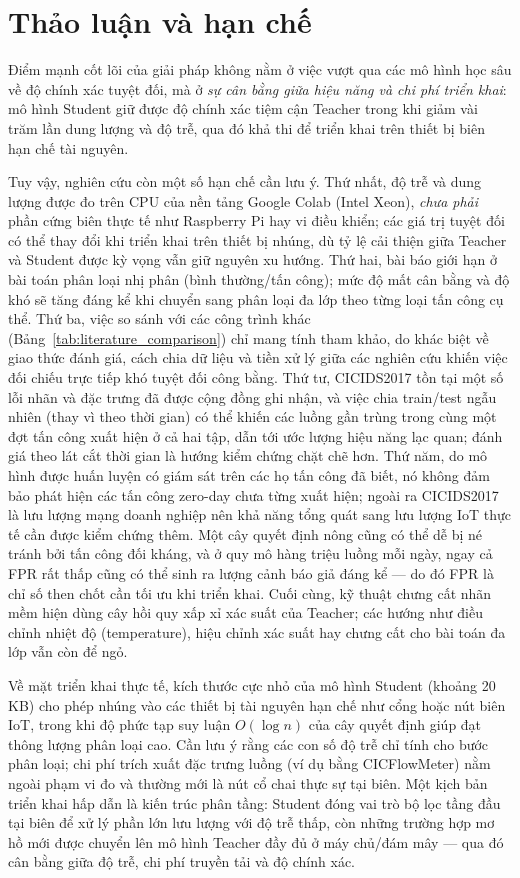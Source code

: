 \section{Thảo luận và hạn chế}
Điểm mạnh cốt lõi của giải pháp không nằm ở việc vượt qua các mô hình học sâu về độ chính xác tuyệt đối, mà ở \emph{sự cân bằng giữa hiệu năng và chi phí triển khai}: mô hình Student giữ được độ chính xác tiệm cận Teacher trong khi giảm vài trăm lần dung lượng và độ trễ, qua đó khả thi để triển khai trên thiết bị biên hạn chế tài nguyên.

Tuy vậy, nghiên cứu còn một số hạn chế cần lưu ý. Thứ nhất, độ trễ và dung lượng được đo trên CPU của nền tảng Google Colab (Intel Xeon), \emph{chưa phải} phần cứng biên thực tế như Raspberry Pi hay vi điều khiển; các giá trị tuyệt đối có thể thay đổi khi triển khai trên thiết bị nhúng, dù tỷ lệ cải thiện giữa Teacher và Student được kỳ vọng vẫn giữ nguyên xu hướng. Thứ hai, bài báo giới hạn ở bài toán phân loại nhị phân (bình thường/tấn công); mức độ mất cân bằng và độ khó sẽ tăng đáng kể khi chuyển sang phân loại đa lớp theo từng loại tấn công cụ thể. Thứ ba, việc so sánh với các công trình khác (Bảng~\ref{tab:literature_comparison}) chỉ mang tính tham khảo, do khác biệt về giao thức đánh giá, cách chia dữ liệu và tiền xử lý giữa các nghiên cứu khiến việc đối chiếu trực tiếp khó tuyệt đối công bằng. Thứ tư, CICIDS2017 tồn tại một số lỗi nhãn và đặc trưng đã được cộng đồng ghi nhận, và việc chia train/test ngẫu nhiên (thay vì theo thời gian) có thể khiến các luồng gần trùng trong cùng một đợt tấn công xuất hiện ở cả hai tập, dẫn tới ước lượng hiệu năng lạc quan; đánh giá theo lát cắt thời gian là hướng kiểm chứng chặt chẽ hơn. Thứ năm, do mô hình được huấn luyện có giám sát trên các họ tấn công đã biết, nó không đảm bảo phát hiện các tấn công zero-day chưa từng xuất hiện; ngoài ra CICIDS2017 là lưu lượng mạng doanh nghiệp nên khả năng tổng quát sang lưu lượng IoT thực tế cần được kiểm chứng thêm. Một cây quyết định nông cũng có thể dễ bị né tránh bởi tấn công đối kháng, và ở quy mô hàng triệu luồng mỗi ngày, ngay cả FPR rất thấp cũng có thể sinh ra lượng cảnh báo giả đáng kể --- do đó FPR là chỉ số then chốt cần tối ưu khi triển khai. Cuối cùng, kỹ thuật chưng cất nhãn mềm hiện dùng cây hồi quy xấp xỉ xác suất của Teacher; các hướng như điều chỉnh nhiệt độ (temperature), hiệu chỉnh xác suất hay chưng cất cho bài toán đa lớp vẫn còn để ngỏ.

Về mặt triển khai thực tế, kích thước cực nhỏ của mô hình Student (khoảng 20 KB) cho phép nhúng vào các thiết bị tài nguyên hạn chế như cổng hoặc nút biên IoT, trong khi độ phức tạp suy luận $O(\log n)$ của cây quyết định giúp đạt thông lượng phân loại cao. Cần lưu ý rằng các con số độ trễ chỉ tính cho bước phân loại; chi phí trích xuất đặc trưng luồng (ví dụ bằng CICFlowMeter) nằm ngoài phạm vi đo và thường mới là nút cổ chai thực sự tại biên. Một kịch bản triển khai hấp dẫn là kiến trúc phân tầng: Student đóng vai trò bộ lọc tầng đầu tại biên để xử lý phần lớn lưu lượng với độ trễ thấp, còn những trường hợp mơ hồ mới được chuyển lên mô hình Teacher đầy đủ ở máy chủ/đám mây --- qua đó cân bằng giữa độ trễ, chi phí truyền tải và độ chính xác.

